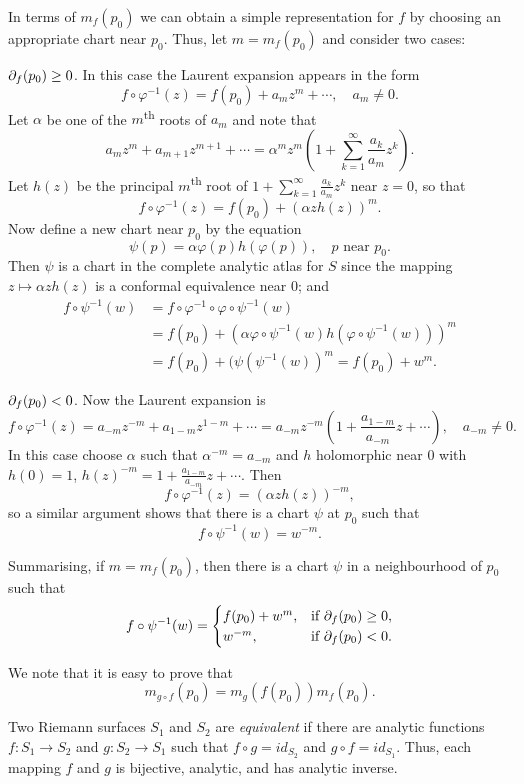 \documentclass[a4paper,11pt]{article}
\begin{document}
In terms of $m_f(p_0)$ we can obtain a simple representation for $f$
by choosing an appropriate chart near $p_0$.  Thus, let $m = m_f(p_0)$
and consider two cases:

\underline{$\partial_f(p_0) \ge 0$}.  In this case the Laurent expansion
appears in the form
$$
f \circ \varphi^{-1}(z) = f(p_0) + a_m z^m + \cdots, \quad a_m \ne 0.
$$
Let $\alpha$ be one of the $m$\textsuperscript{th} roots of $a_m$ and
note that
$$
a_m z^m + a_{m+1} z^{m+1} + \cdots = \alpha^m z^m (1 +
\sum_{k=1}^{\infty} \frac{a_k}{a_m} z^k).
$$
Let $h(z)$ be the principal $m$\textsuperscript{th} root of $1 +
\sum_{k=1}^{\infty} \frac{a_k}{a_m} z^k$ near $z=0$, so that
$$
f\circ \varphi^{-1}(z) = f(p_0) + (\alpha z h(z))^m.
$$
Now define a new chart near $p_0$ by the equation
$$
\psi(p) = \alpha\varphi(p) h(\varphi(p)),\quad p \text{ near }p_0.
$$
Then $\psi$ is a chart in the complete analytic atlas for $S$ since
the mapping $z \mapsto \alpha z h(z)$ is a conformal equivalence near
0; and
$$
\begin{aligned}
  f\circ \psi^{-1}(w) 
  &= f\circ \varphi^{-1} \circ \varphi \circ \psi^{-1}(w) \\
  &= f(p_0) + (\alpha \varphi \circ \psi^{-1}(w) h(\varphi\circ
  \psi^{-1}(w)))^m\\
  &= f(p_0) + (\psi(\psi^{-1}(w))^m
  = f(p_0) + w^m.  
\end{aligned}
$$

\underline{$\partial_f(p_0) < 0$}.  Now the Laurent expansion is
$$
f\circ \varphi^{-1}(z) 
= a_{-m}z^{-m} + a_{1-m}z^{1-m} + \cdots
= a_{-m}z^{-m}( 1 + \frac{a_{1-m}}{a_{-m}} z + \cdots),
\quad a_{-m} \ne 0.
$$
In this case choose $\alpha$ such that $\alpha^{-m} = a_{-m}$ and $h$
holomorphic near 0 with $h(0) = 1$, $h(z)^{-m} = 1 +
\frac{a_{1-m}}{a_{-m}} z + \cdots$.  Then
$$
f \circ \varphi^{-1}(z) = (\alpha z h(z))^{-m},
$$
so a similar argument shows that there is a chart $\psi$ at $p_0$ such
that
$$
f \circ \psi^{-1}(w) = w^{-m}.
$$

Summarising, if $m = m_f(p_0)$, then there is a chart $\psi$ in a
neighbourhood of $p_0$ such that
$$
f \circ \psi^{-1}(w)
=
\begin{cases}
  f(p_0) + w^m, & \text{if }\partial_f(p_0) \ge 0,\\
  w^{-m}, & \text{if }\partial_f(p_0) < 0.
\end{cases}
$$

We note that it is easy to prove that
$$
m_{g\circ f}(p_0) = m_g(f(p_0)) m_f(p_0).
$$

\begin{defn}
  \label{def:10}
  Two Riemann surfaces $S_1$ and $S_2$ are \emph{equivalent} if there
  are analytic functions $f : S_1 \to S_2$ and $g : S_2 \to S_1$ such
  that $f \circ g = id_{S_2}$ and $g \circ f = id_{S_1}$.  Thus, each
  mapping $f$ and $g$ is bijective, analytic, and has analytic
  inverse.
\end{defn}
\end{document}
